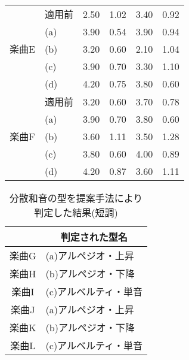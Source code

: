\begin{table}[h]
\begin{tabular}{|c|l|r|r|r|r|}
      \multirow{5}{*}{楽曲E}  & 適用前 & 2.50  & 1.02  & 3.40  & 0.92 \\ \cline{2-6}
      & (a) & 3.90  & 0.54  & 3.90  & 0.94 \\ \cline{2-6}
      & (b) & 3.20  & 0.60  & 2.10  & 1.04 \\ \cline{2-6}
      & (c) & 3.90  & 0.70  & 3.30  & 1.10 \\ \cline{2-6}
      & (d) & 4.20  & 0.75  & 3.80  & 0.60 \\ \cline{1-6}

      \multirow{5}{*}{楽曲F}  & 適用前 & 3.20  & 0.60  & 3.70  & 0.78 \\ \cline{2-6}
      & (a) & 3.90  & 0.70  & 3.80  & 0.60 \\ \cline{2-6}
      & (b) & 3.60  & 1.11  & 3.50  & 1.28 \\ \cline{2-6}
      & (c) & 3.80  & 0.60  & 4.00  & 0.89 \\ \cline{2-6}
      & (d) & 4.20  & 0.87  & 3.60  & 1.11 \\ \cline{1-6}
  \end{tabular}
\end{table}

\begin{table}[tbp]
  \caption{分散和音の型を提案手法により判定した結果(短調)}
  \label{tab:musictitle_tan}
  \centering
  \begin{tabular}{|c|l|} \hline
       & \multicolumn{1}{|c|}{判定された型名} \\ \hline
       楽曲G & (a)アルペジオ・上昇 \\ \hline
       楽曲H & (b)アルペジオ・下降 \\ \hline
       楽曲I & (c)アルベルティ・単音 \\ \hline
       楽曲J & (a)アルペジオ・上昇 \\ \hline
       楽曲K & (b)アルペジオ・下降 \\ \hline
       楽曲L & (c)アルベルティ・単音 \\ \hline
  \end{tabular}
\end{table}

